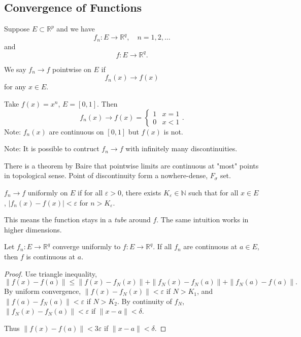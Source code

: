 
\subsection{Convergence of Functions}

Suppose $E \subset \mathbb{R}^p$ and we have \[
	f_n: E \to \mathbb{R}^q, \quad n = 1,2,\ldots
\] 
and
\[
	f: E \to \mathbb{R}^q
.\] 
\begin{definition}
	We say $f_n \to f$ pointwise on $E$ if
	\[
		f_n(x) \to f(x)
	\]
	for any $x \in E$.
\end{definition}

\begin{example}
	Take $f(x) = x^n$, $E = [0,1]$.
	Then
	 \[
		f_n(x) \to f(x) = \begin{cases}
			1&x = 1\\
			0&x<1
		\end{cases}
	.\] 
	Note: $f_n(x)$ are continuous on $[0,1]$ but $f(x)$ is not.

	Note: It is possible to contruct $f_n \to f$ with infinitely many discontinuities.
\end{example}
\begin{remark}
	There is a theorem by Baire that pointwise limits are continuous at "most" points in topological sense. Point of discontinuity form a nowhere-dense, $F_\sigma$ set.
\end{remark}

\begin{theorem}
	$f_n \to f$ uniformly on $E  $ if for all $\varepsilon>0$, there exists $K_\varepsilon \in \mathbb{N}$ such that for all $x \in E$, $|f_n(x) - f(x)|<\varepsilon$ for $n > K_\varepsilon$.
\end{theorem}
\begin{intuition}
	This means the function stays in a  \textit{tube} around $f$. The same intuition works in higher dimensions.
\end{intuition}

\begin{theorem}
	Let $f_n: E \to \mathbb{R}^q$ converge uniformly to $f: E \to \mathbb{R}^q$. If all  $f_n$ are continuous at $a \in E$, then $f$ is continuous at $a$.
\end{theorem}
\begin{proof}
	Use triangle inequality,
	\[
		\|f(x) - f(a)\|\le \|f(x) - f_N(x)\| + \|f_N(x) - f_N(a)\| + \|f_N(a) - f(a)\|
	.\] 
	By uniform convergence, $\|f(x) - f_N(x)\|<\varepsilon$ if $N >K_1$, and $\|f(a) - f_N(a)\|<\varepsilon$ if $N > K_2$. By continuity of $f_N$, $\|f_N(x) - f_N(a)\| < \varepsilon$ if $\|x - a\|< \delta$.

	Thus $\|f(x) - f(a)\| < 3 \varepsilon$ if $\|x - a\|< \delta$.
\end{proof}

